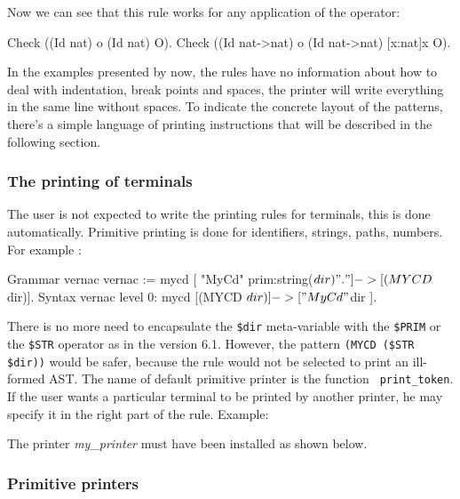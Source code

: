 Now we can see that this rule works for any application of the
operator:

\begin{coq_example}
Check ((Id nat) o (Id nat) O).
Check ((Id nat->nat) o (Id nat->nat) [x:nat]x O).
\end{coq_example}

In the examples presented by now, the rules have no information about
how to deal with indentation, break points and spaces, the printer
will write everything in the same line without spaces. To indicate the
concrete layout of the patterns, there's a simple language of printing
instructions that will be described in the following section.


\subsubsection{The printing of terminals}
The user is not expected to write the printing rules for terminals,
this is done automatically.  Primitive printing is done for
identifiers, strings, paths, numbers. For example : 

\begin{coq_example*}
Grammar vernac vernac :=
  mycd [ "MyCd" prim:string($dir) "." ] -> [(MYCD $dir)].
Syntax vernac level 0:
  mycd [(MYCD $dir)] -> [ "MyCd " $dir ].
\end{coq_example*}

There is no more need to encapsulate the \verb+$dir+ meta-variable
with the \verb+$PRIM+ or the \verb+$STR+ operator as in the version
6.1. However, the pattern \verb+(MYCD ($STR $dir))+ would be safer,
because the rule would not be selected to print an ill-formed AST. The
name of default primitive printer is the {\ocaml} function {\tt
print\_token}. If the user wants a particular terminal to be printed
by another printer, he may specify it in the right part of the
rule. Example:


The printer \textit{my\_printer} must have been installed as shown
below.

\subsubsection{Primitive printers}

